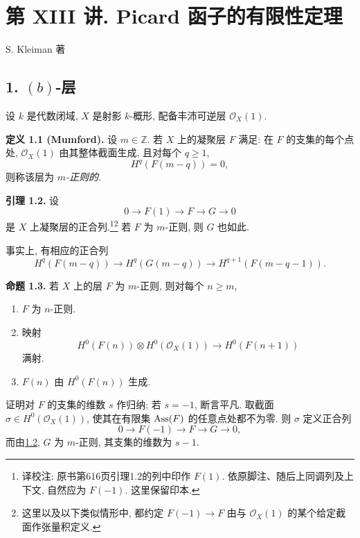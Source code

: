 \section*{第 XIII 讲. Picard 函子的有限性定理}
\begin{center}
S. Kleiman 著
\end{center}

\subsection*{1. \texorpdfstring{\((b)\)}{(b)}-层}

设 \(k\) 是代数闭域, \(X\) 是射影 \(k\)-概形, 配备丰沛可逆层 \(\mathcal O_X(1)\).

\textbf{定义 1.1 (Mumford).} 设 \(m\in\mathbb Z\). 若 \(X\) 上的凝聚层 \(F\) 满足: 在 \(F\) 的支集的每个点处, \(\mathcal O_X(1)\) 由其整体截面生成, 且对每个 \(q\geq1\),
\[
  H^q(F(m-q))=0,
\]
则称该层为 \emph{\(m\)-正则的}.

\textbf{引理 1.2.} 设
\[
  0\longrightarrow F(1)\longrightarrow F\longrightarrow G\longrightarrow0
\]
是 \(X\) 上凝聚层的正合列.\footnote{译校注: 原书第616页引理1.2的列中印作 $F(1)$. 依原脚注、随后上同调列及上下文, 自然应为 $F(-1)$. 这里保留印本.}\footnote{这里以及以下类似情形中, 都约定 \(F(-1)\to F\) 由与 \(\mathcal O_X(1)\) 的某个给定截面作张量积定义.} 若 \(F\) 为 \(m\)-正则, 则 \(G\) 也如此.

事实上, 有相应的正合列
\[
  H^q(F(m-q))\longrightarrow H^q(G(m-q))
  \longrightarrow H^{q+1}(F(m-q-1)).
\]

\textbf{命题 1.3.} 若 \(X\) 上的层 \(F\) 为 \(m\)-正则, 则对每个 \(n\geq m\),
\begin{enumerate}[label=(\roman*)]
\item \(F\) 为 \(n\)-正则.
\item 映射
\[
  H^0(F(n))\otimes H^0(\mathcal O_X(1))
  \longrightarrow H^0(F(n+1))
\]
满射.
\item \(F(n)\) 由 \(H^0(F(n))\) 生成.
\end{enumerate}

证明对 \(F\) 的支集的维数 \(s\) 作归纳; 若 \(s=-1\), 断言平凡. 取截面 \(\sigma\in H^0(\mathcal O_X(1))\), 使其在有限集 \(\operatorname{Ass}(F)\) 的任意点处都不为零. 则 \(\sigma\) 定义正合列
\[
  0\longrightarrow F(-1)\longrightarrow F\longrightarrow G\longrightarrow0,
\]
而由\hyperlink{sga6.e13.lem.1-2}{1.2}, \(G\) 为 \(m\)-正则, 其支集的维数为 \(s-1\).

